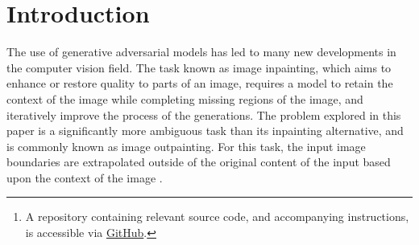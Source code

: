 \documentclass{article}
\begin{document}
 






\printAffiliationsAndNotice{}  

\begin{abstract} 
Although humans perform well at predicting what exists beyond the boundaries of an image, deep models struggle to understand context and extrapolation through retained information. This task is known as image outpainting and involves generating realistic expansions of an image’s boundaries. Current models use generative adversarial networks to generate results which lack localized image feature consistency and appear fake. We propose two methods to improve this issue: the use of a local and global discriminator, and the addition of residual blocks within the encoding section of the network. Comparisons of our model and the baseline’s L1 loss, mean squared error (MSE) loss, and qualitative differences reveal our model is able to naturally extend object boundaries and produce more internally consistent images compared to current methods but produces lower fidelity images.\footnote[2]{A repository containing relevant source code, and accompanying instructions, is accessible via \href{https://github.com/etarthur/Outpainting}{GitHub}.}
\end{abstract} 

\section{Introduction}
The use of generative adversarial models has led to many new developments in the computer vision field. The task known as image inpainting, which aims to enhance or restore quality to parts of an image, requires a model to retain the context of the image while completing missing regions of the image, and iteratively improve the process of the generations. The problem explored in this paper is a significantly more ambiguous task than its inpainting alternative, and is commonly known as image outpainting. For this task, the input image boundaries are extrapolated outside of the original content of the input based upon the context of the image \citep{sabini_painting_2018}.
\end{document}
